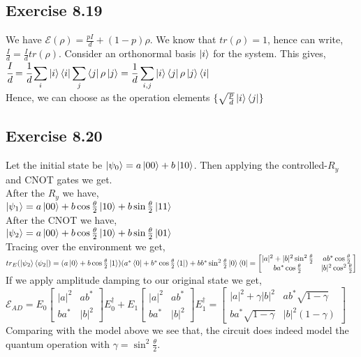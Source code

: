 \documentclass[a4paper,12pt]{article}
\begin{document}
\subsection*{Exercise 8.19}
We have $\mathcal{E}(\rho)=\frac{pI}{d}+(1-p)\rho$. We know that $tr(\rho)=1$, hence can write,
$\frac{I}{d}=\frac{I}{d}tr(\rho)$. Consider an orthonormal basis $\ket{i}$ for the system. This gives,\\
$\cfrac{I}{d}=\displaystyle \cfrac{1}{d}\sum_i \ket{i}\bra{i}\sum_j \bra{j}\rho\ket{j}=
\displaystyle \frac{1}{d}\sum_{i,j} \ket{i} \bra{j}\rho\ket{j}\bra{i}$\\
Hence, we can choose as the operation elements $\{\sqrt{\frac{p}{d}}\ket{i}\bra{j}\}$
\subsection*{Exercise 8.20}
Let the initial state be $\ket{\psi_0}=a\ket{00}+b\ket{10}$. Then applying the controlled-$R_y$ and CNOT gates we get.\\
After the $R_y$ we have,\\
$\ket{\psi_1}=a\ket{00}+b\cos{\frac{\theta}{2}}\ket{10}+b\sin{\frac{\theta}{2}}\ket{11}$\\
After the CNOT we have,\\
$\ket{\psi_2}=a\ket{00}+b\cos{\frac{\theta}{2}}\ket{10}+b\sin{\frac{\theta}{2}}\ket{01}$\\
Tracing over the environment we get,\\
$tr_E(\ket{\psi_2}\bra{\psi_2})=(a\ket{0}+b\cos{\frac{\theta}{2}}\ket{1})(a^*\bra{0}+b^*\cos{\frac{\theta}{2}}\bra{1})+
bb^*\sin^2{\frac{\theta}{2}}\ket{0}\bra{0}=
\begin{bmatrix}
    |a|^2+|b|^2\sin^2{\frac{\theta}{2}} & ab^*\cos{\frac{\theta}{2}}\\
    ba^*\cos{\frac{\theta}{2}} &    |b|^2\cos^2{\frac{\theta}{2}}
\end{bmatrix}$\\
If we apply amplitude damping to our original state we get,\\
$\mathcal{E}_{AD}=E_0
\begin{bmatrix}
    |a|^2&ab^*\\
    ba^*& |b|^2
\end{bmatrix}
E_0^\dagger +E_1
\begin{bmatrix}
    |a|^2&ab^*\\
    ba^*& |b|^2
\end{bmatrix}
E_1^\dagger=
\begin{bmatrix}
    |a|^2+\gamma|b|^2& ab^*\sqrt{1-\gamma}\\
    ba^*\sqrt{1-\gamma} & |b|^2(1-\gamma)
\end{bmatrix}$\\
Comparing with the model above we see that, the circuit does indeed model the quantum operation
with $\gamma=\sin^2{\frac{\theta}{2}}$.
\end{document}
